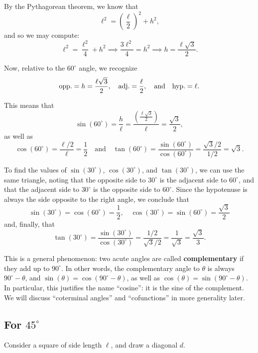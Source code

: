 \documentclass{ximera}
\begin{document}
By the Pythagorean theorem, we know that $$\ell^2 = \left(\frac{\ell}{2}\right)^2 + h^2,$$and so we may compute: $$\ell^2 = \frac{\ell^2}{4} + h^2 \implies \frac{3\ell^2}{4} = h^2 \implies h = \frac{\ell\sqrt{3}}{2}.$$

Now, relative to the $60^\circ$ angle, we recognize $${\rm opp.} = h = \frac{\ell\sqrt{3}}{2}, \quad {\rm adj.} = \frac{\ell}{2}, \quad\mbox{and}\quad {\rm hyp.} = \ell.$$

This means that $$\sin(60^\circ) = \frac{h}{\ell} = \frac{\left(\frac{\ell\sqrt{3}}{2}\right)}{\ell} = \frac{\sqrt{3}}{2},$$as well as $$\cos(60^\circ) = \frac{\ell/2}{\ell} = \frac{1}{2}\quad\mbox{and}\quad \tan(60^\circ) = \frac{\sin(60^\circ)}{\cos(60^\circ)} = \frac{\sqrt{3}/2}{1/2} = \sqrt{3}.$$

To find the values of $\sin(30^\circ)$, $\cos(30^\circ)$, and $\tan(30^\circ)$, we can use the same triangle, noting that the opposite side to $30^\circ$ is the adjacent side to $60^\circ$, and that the adjacent side to $30^\circ$ is the opposite side to $60^\circ$. Since the hypotenuse is always the side opposite to the right angle, we conclude that $$\sin(30^\circ) = \cos(60^\circ) = \frac{1}{2}, \quad \cos(30^\circ) = \sin(60^\circ) = \frac{\sqrt{3}}{2}$$and, finally, that $$\tan(30^\circ) = \frac{\sin(30^\circ)}{\cos(30^\circ)} = \frac{1/2}{\sqrt{3}/2} = \frac{1}{\sqrt{3}} = \frac{\sqrt{3}}{3}.$$

\begin{remark}
  This is a general phenomenon: two acute angles are called {\bf complementary} if they add up to $90^\circ$. In other words, the complementary angle to $\theta$ is always $90^\circ - \theta$, and $\sin(\theta) = \cos(90^\circ - \theta)$, as well as $\cos(\theta) = \sin(90^\circ - \theta)$. In particular, this justifies the name ``cosine'': it is the sine of the complement. We will discuss ``coterminal angles'' and ``cofunctions'' in more generality later.
\end{remark}

\subsection{For $45^\circ$}

Consider a square of side length $\ell$, and draw a diagonal $d$.
\end{document}
